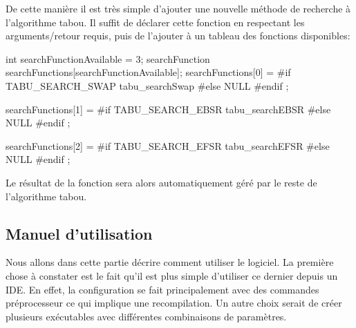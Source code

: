 \documentclass[hideweeklyreports]{polytech/polytech}
\begin{document}
				De cette manière il est très simple d'ajouter une nouvelle méthode de recherche à l'algorithme tabou. Il suffit de déclarer cette fonction en respectant les arguments/retour requis, puis de l'ajouter à un tableau des fonctions disponibles:
				\begin{csource}
int searchFunctionAvailable = 3;
searchFunction searchFunctions[searchFunctionAvailable];
searchFunctions[0] =
	#if TABU_SEARCH_SWAP
		tabu_searchSwap
	#else
		NULL
	#endif
;

searchFunctions[1] =
	#if TABU_SEARCH_EBSR
		tabu_searchEBSR
	#else
		NULL
	#endif
;

searchFunctions[2] =
	#if TABU_SEARCH_EFSR
		tabu_searchEFSR
	#else
		NULL
	#endif
;
				\end{csource}
				
				Le résultat de la fonction sera alors automatiquement géré par le reste de l'algorithme tabou.
			
			\subsection{Manuel d'utilisation}
				Nous allons dans cette partie décrire comment utiliser le logiciel. La première chose à constater est le fait qu'il est plus simple d'utiliser ce dernier depuis un IDE. En effet, la configuration se fait principalement avec des commandes préprocesseur ce qui implique une recompilation. Un autre choix serait de créer plusieurs exécutables avec différentes combinaisons de paramètres.
				
\end{document}
